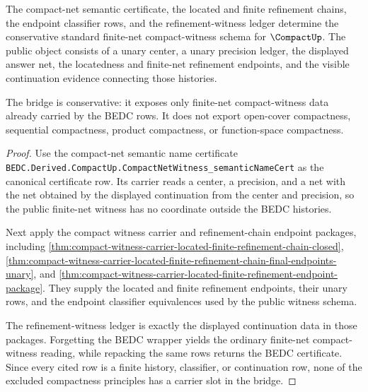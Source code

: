 \begin{theorem}\label{thm:compact-witness-public-surface-bridge}
The compact-net semantic certificate, the located and finite refinement chains,
the endpoint classifier rows, and the refinement-witness ledger determine the
conservative standard finite-net compact-witness schema for $\CompactUp$.
The public object consists of a unary center, a unary precision ledger, the
displayed answer net, the locatedness and finite-net refinement endpoints, and
the visible continuation evidence connecting those histories.

The bridge is conservative: it exposes only finite-net compact-witness data
already carried by the BEDC rows. It does not export open-cover compactness,
sequential compactness, product compactness, or function-space compactness.
\end{theorem}
\begin{proof}
Use the compact-net semantic name certificate
\texttt{BEDC.Derived.CompactUp.CompactNetWitness\_semanticNameCert} as the
canonical certificate row. Its carrier reads a center, a precision, and a net
with the net obtained by the displayed continuation from the center and
precision, so the public finite-net witness has no coordinate outside the
BEDC histories.

Next apply the compact witness carrier and refinement-chain endpoint packages,
including \autoref{thm:compact-witness-carrier-located-finite-refinement-chain-closed},
\autoref{thm:compact-witness-carrier-located-finite-refinement-chain-final-endpoints-unary},
and \autoref{thm:compact-witness-carrier-located-finite-refinement-endpoint-package}.
They supply the located and finite refinement endpoints, their unary rows, and
the endpoint classifier equivalences used by the public witness schema.

The refinement-witness ledger is exactly the displayed continuation data in
those packages. Forgetting the BEDC wrapper yields the ordinary finite-net
compact-witness reading, while repacking the same rows returns the BEDC
certificate. Since every cited row is a finite history, classifier, or
continuation row, none of the excluded compactness principles has a carrier
slot in the bridge.
\end{proof}
